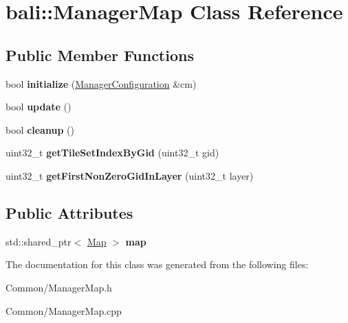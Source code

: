 \hypertarget{classbali_1_1_manager_map}{\section{bali\-:\-:Manager\-Map Class Reference}
\label{classbali_1_1_manager_map}
}
\subsection*{Public Member Functions}
\begin{DoxyCompactItemize}
\item 
\hypertarget{classbali_1_1_manager_map_ae9a707d8bbd09f35c45b88a81778c5de}{bool {\bfseries initialize} (\hyperlink{classbali_1_1_manager_configuration}{Manager\-Configuration} \&cm)}\label{classbali_1_1_manager_map_ae9a707d8bbd09f35c45b88a81778c5de}

\item 
\hypertarget{classbali_1_1_manager_map_a64114ecc17a140b3fd46b249424ef8f7}{bool {\bfseries update} ()}\label{classbali_1_1_manager_map_a64114ecc17a140b3fd46b249424ef8f7}

\item 
\hypertarget{classbali_1_1_manager_map_a74e8a88dd5acdc0b4240e05a6c893047}{bool {\bfseries cleanup} ()}\label{classbali_1_1_manager_map_a74e8a88dd5acdc0b4240e05a6c893047}

\item 
\hypertarget{classbali_1_1_manager_map_aa9ac78da793c142393adcd97ab6898a5}{uint32\-\_\-t {\bfseries get\-Tile\-Set\-Index\-By\-Gid} (uint32\-\_\-t gid)}\label{classbali_1_1_manager_map_aa9ac78da793c142393adcd97ab6898a5}

\item 
\hypertarget{classbali_1_1_manager_map_a665276b7de7092a68bdd00756b8d0071}{uint32\-\_\-t {\bfseries get\-First\-Non\-Zero\-Gid\-In\-Layer} (uint32\-\_\-t layer)}\label{classbali_1_1_manager_map_a665276b7de7092a68bdd00756b8d0071}

\end{DoxyCompactItemize}
\subsection*{Public Attributes}
\begin{DoxyCompactItemize}
\item 
\hypertarget{classbali_1_1_manager_map_a66e30eebc8ab9301e4842bededf959b1}{std\-::shared\-\_\-ptr$<$ \hyperlink{classbali_1_1_map}{Map} $>$ {\bfseries map}}\label{classbali_1_1_manager_map_a66e30eebc8ab9301e4842bededf959b1}

\end{DoxyCompactItemize}


The documentation for this class was generated from the following files\-:\begin{DoxyCompactItemize}
\item 
Common/Manager\-Map.\-h\item 
Common/Manager\-Map.\-cpp\end{DoxyCompactItemize}
